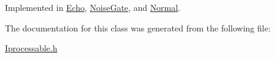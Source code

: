 Implemented in \hyperlink{classEcho_aea3e5f4352454ad3182695044ebefacf}{Echo}, \hyperlink{classNoiseGate_a05c33d8853ee2764af12cce10ae0e59d}{Noise\+Gate}, and \hyperlink{classNormal_a243a816f6a995ca5145a160b3b3d8b8f}{Normal}.



The documentation for this class was generated from the following file\+:\begin{DoxyCompactItemize}
\item 
\hyperlink{Iprocessable_8h}{Iprocessable.\+h}\end{DoxyCompactItemize}
